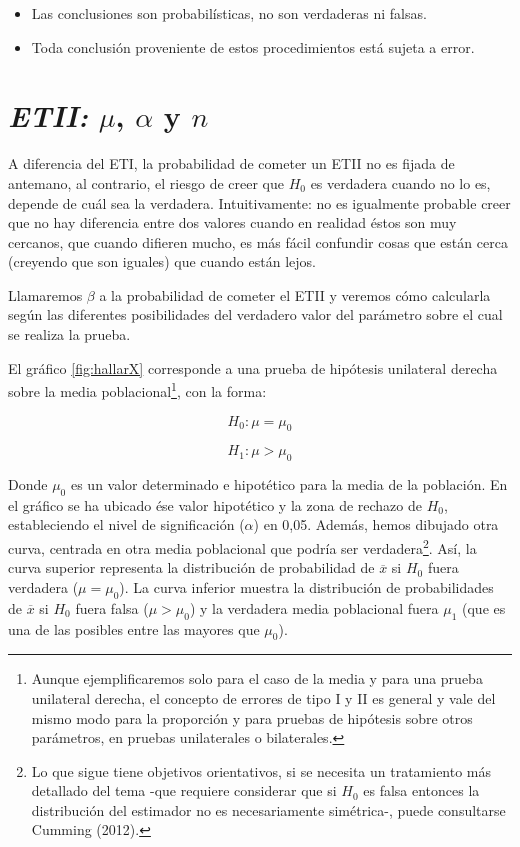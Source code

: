 \documentclass[]{book}
\let\rmarkdownfootnote\footnote%
\def\footnote{\protect\rmarkdownfootnote}
\begin{document}
\begin{itemize}
\item
  Las conclusiones son probabilísticas, no son verdaderas ni falsas.
\item
  Toda conclusión proveniente de estos procedimientos está sujeta a error.
\end{itemize}

\hypertarget{etii-mu-alpha-y-n}{%
\section{\texorpdfstring{\emph{ETII:} \(\mu\), \(\alpha\) y \(n\)}{ETII: \textbackslash{}mu, \textbackslash{}alpha y n}}\label{etii-mu-alpha-y-n}}

A diferencia del ETI, la probabilidad de cometer un ETII no es fijada de
antemano, al contrario, el riesgo de creer que \(H_{0}\) es verdadera cuando
no lo es, depende de cuál sea la verdadera. Intuitivamente: no es
igualmente probable creer que no hay diferencia entre dos valores cuando
en realidad éstos son muy cercanos, que cuando difieren mucho, es más
fácil confundir cosas que están cerca (creyendo que son iguales) que
cuando están lejos.

Llamaremos \(\beta\) a la probabilidad de cometer el ETII y veremos cómo
calcularla según las diferentes posibilidades del verdadero valor del
parámetro sobre el cual se realiza la prueba.

El gráfico \ref{fig:hallarX} corresponde a una prueba de hipótesis unilateral derecha
sobre la media poblacional\footnote{Aunque ejemplificaremos solo para el caso de la media y para una prueba unilateral derecha, el concepto de errores de tipo I y II es general y vale del mismo modo para la proporción y para pruebas de hipótesis sobre otros parámetros, en pruebas unilaterales o bilaterales.}, con la forma:

\[H_{0}:\mu = \mu_{0}\]

\[H_{1}:\mu > \mu_{0}\]

Donde \(\mu_{0}\) es un valor determinado e hipotético para la media de la
población. En el gráfico se ha ubicado ése valor hipotético y la zona de
rechazo de \(H_0\), estableciendo el nivel de significación (\(\alpha\)) en 0,05.
Además, hemos dibujado otra curva, centrada en otra media poblacional
que podría ser verdadera\footnote{Lo que sigue tiene objetivos orientativos, si se necesita un tratamiento más detallado del tema -que requiere considerar que si \(H_0\) es falsa entonces la distribución del estimador no es necesariamente simétrica-, puede consultarse Cumming (2012).}. Así, la curva superior representa la
distribución de probabilidad de \(\overline{x}\) si \(H_0\) fuera verdadera
(\(\mu = \mu_{0}\)). La curva inferior muestra la distribución de
probabilidades de \(\overline{x}\) si \(H_{0}\) fuera falsa (\(\mu > \mu_{0}\)) y
la verdadera media poblacional fuera \(\mu_{1}\) (que es una de las
posibles entre las mayores que \(\mu_{0}\)).
\end{document}
